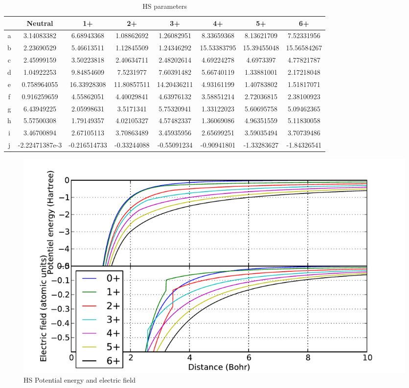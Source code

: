 \documentclass[12pt,letterpaper]{article}
\begin{document}
\begin{table}
\hspace{-45pt}
\begin{tabular}{|c|c|c|c|c|c|c|c|} \hline
  & Neutral         & 1+            & 2+            & 3+            & 4+            & 5+            & 6+            \\ \hline \hline
a & 3.14083382      & 6.68943368    & 1.08862692    & 1.26082951    & 8.33659368    & 8.13621709    & 7.52331956    \\ \hline
b & 2.23690529      & 5.46613511    & 1.12845509    & 1.24346292    & 15.53383795   & 15.39455048   & 15.56584267   \\ \hline
c & 2.45999159      & 3.50223818    & 2.40634711    & 2.48202614    & 4.69224278    & 4.6973397     & 4.77821787    \\ \hline
d & 1.04922253      & 9.84854609    & 7.5231977     & 7.60391482    & 5.66740119    & 1.33881001    & 2.17218048    \\ \hline
e & 0.758964055     & 16.33928308   & 11.80857511   & 14.20436211   & 4.93161199    & 1.40783802    & 1.51817071    \\ \hline
f & 0.916259659     & 4.55862051    & 4.40029841    & 4.63976132    & 3.58851214    & 2.72036815    & 2.38100923    \\ \hline
g & 6.43949225      & 2.05998631    & 3.5171341     & 5.75320941    & 1.33122023    & 5.60695758    & 5.09462365    \\ \hline
h & 5.57500308      & 1.79149357    & 4.02105327    & 4.57482337    & 1.36069086    & 4.96351559    & 5.11830058    \\ \hline
i & 3.46700894      & 2.67105113    & 3.70863489    & 3.45935956    & 2.65699251    & 3.59035494    & 3.70739486    \\ \hline
j & -2.22471387e-3  & -0.216514733  & -0.33244088   & -0.55091234   & -0.90941801   & -1.33283627   & -1.84326541   \\ \hline
\end{tabular}
\caption{\label{table:params}HS parameters}
\end{table}

\begin{figure}
\includegraphics[width=0.98\columnwidth]{hs_1}
\caption{\label{fig:hs:1}HS Potential energy and electric field}
\end{figure}
\end{document}
